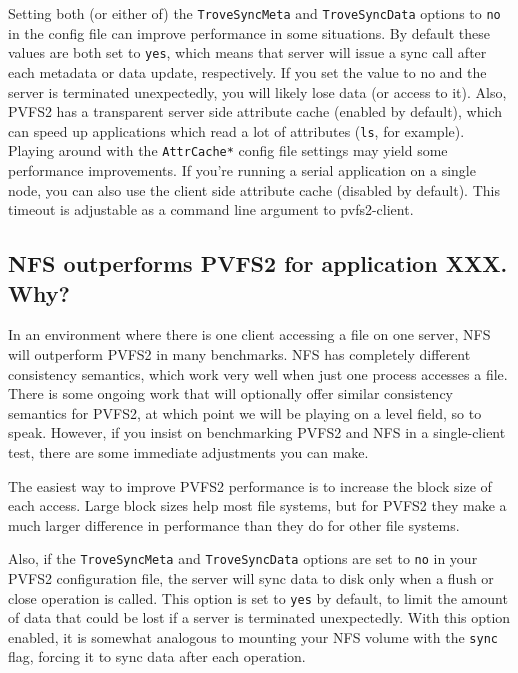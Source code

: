 \documentclass[11pt,letterpaper]{article}
\begin{document}
Setting both (or either of) the \texttt{TroveSyncMeta} and
\texttt{TroveSyncData} options to \texttt{no} in the config file can
improve performance in some situations.  By default these values are
both set to \texttt{yes}, which means that server will issue a sync
call after each metadata or data update, respectively.  If you set the
value to no and the server is terminated unexpectedly, you will likely
lose data (or access to it).  Also, PVFS2 has a transparent server
side attribute cache (enabled by default), which can speed up
applications which read a lot of attributes (\texttt{ls}, for
example).  Playing around with the \texttt{AttrCache*} config file
settings may yield some performance improvements.  If you're running a
serial application on a single node, you can also use the client side
attribute cache (disabled by default).  This timeout is adjustable as
a command line argument to pvfs2-client.

\subsection{NFS outperforms PVFS2 for application XXX. Why?}
\label{sec:nfs_vs_pvfs2}

In an environment where there is one client accessing a file on one
server, NFS will outperform PVFS2 in many benchmarks.  NFS has
completely different consistency semantics, which work very well when
just one process accesses a file.  There is some ongoing work that
will optionally offer similar consistency semantics for PVFS2, at
which point we will be playing on a level field, so to speak.
However, if you insist on benchmarking PVFS2 and NFS in a
single-client test, there are some immediate adjustments you can make.

The easiest way to improve PVFS2 performance is to increase the block
size of each access.  Large block sizes help most file systems, but
for PVFS2 they make a much larger difference in performance than they
do for other file systems.

Also, if the \texttt{TroveSyncMeta} and \texttt{TroveSyncData} options
are set to \texttt{no} in your PVFS2 configuration file, the server
will sync data to disk only when a flush or close operation is called.
This option is set to \texttt{yes} by default, to limit the amount of
data that could be lost if a server is terminated unexpectedly.  With
this option enabled, it is somewhat analogous to mounting your NFS
volume with the \texttt{sync} flag, forcing it to sync data after each
operation.
\end{document}
